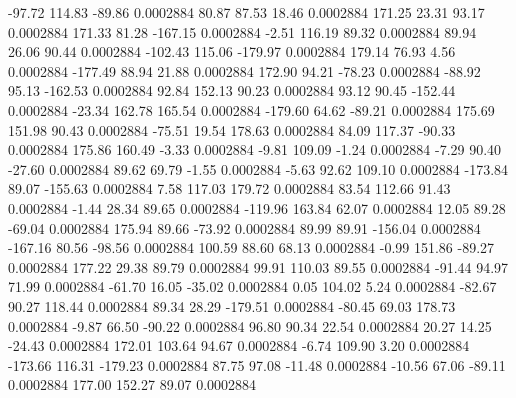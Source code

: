       -97.72      114.83      -89.86     0.0002884
       80.87       87.53       18.46     0.0002884
      171.25       23.31       93.17     0.0002884
      171.33       81.28     -167.15     0.0002884
       -2.51      116.19       89.32     0.0002884
       89.94       26.06       90.44     0.0002884
     -102.43      115.06     -179.97     0.0002884
      179.14       76.93        4.56     0.0002884
     -177.49       88.94       21.88     0.0002884
      172.90       94.21      -78.23     0.0002884
      -88.92       95.13     -162.53     0.0002884
       92.84      152.13       90.23     0.0002884
       93.12       90.45     -152.44     0.0002884
      -23.34      162.78      165.54     0.0002884
     -179.60       64.62      -89.21     0.0002884
      175.69      151.98       90.43     0.0002884
      -75.51       19.54      178.63     0.0002884
       84.09      117.37      -90.33     0.0002884
      175.86      160.49       -3.33     0.0002884
       -9.81      109.09       -1.24     0.0002884
       -7.29       90.40      -27.60     0.0002884
       89.62       69.79       -1.55     0.0002884
       -5.63       92.62      109.10     0.0002884
     -173.84       89.07     -155.63     0.0002884
        7.58      117.03      179.72     0.0002884
       83.54      112.66       91.43     0.0002884
       -1.44       28.34       89.65     0.0002884
     -119.96      163.84       62.07     0.0002884
       12.05       89.28      -69.04     0.0002884
      175.94       89.66      -73.92     0.0002884
       89.99       89.91     -156.04     0.0002884
     -167.16       80.56      -98.56     0.0002884
      100.59       88.60       68.13     0.0002884
       -0.99      151.86      -89.27     0.0002884
      177.22       29.38       89.79     0.0002884
       99.91      110.03       89.55     0.0002884
      -91.44       94.97       71.99     0.0002884
      -61.70       16.05      -35.02     0.0002884
        0.05      104.02        5.24     0.0002884
      -82.67       90.27      118.44     0.0002884
       89.34       28.29     -179.51     0.0002884
      -80.45       69.03      178.73     0.0002884
       -9.87       66.50      -90.22     0.0002884
       96.80       90.34       22.54     0.0002884
       20.27       14.25      -24.43     0.0002884
      172.01      103.64       94.67     0.0002884
       -6.74      109.90        3.20     0.0002884
     -173.66      116.31     -179.23     0.0002884
       87.75       97.08      -11.48     0.0002884
      -10.56       67.06      -89.11     0.0002884
      177.00      152.27       89.07     0.0002884
